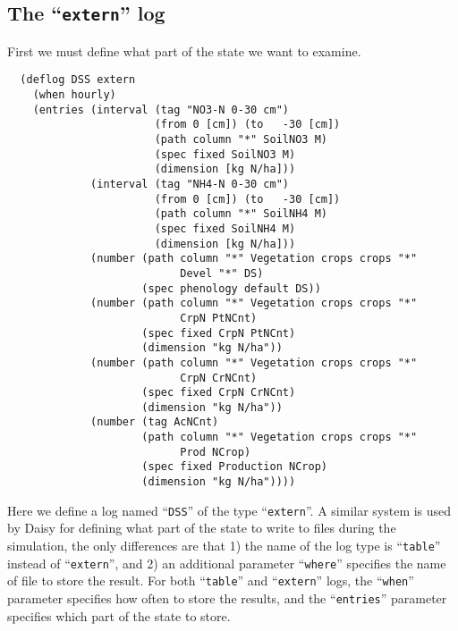 \documentclass[a4paper]{article}
\newcommand{\dname}[1]{``\texttt{#1}''}
\begin{document}
\subsection{The \dname{extern} log}

First we must define what part of the state we want to examine.
\begin{verbatim}
  (deflog DSS extern
    (when hourly)
    (entries (interval (tag "NO3-N 0-30 cm")
                       (from 0 [cm]) (to   -30 [cm])
                       (path column "*" SoilNO3 M)
                       (spec fixed SoilNO3 M)
                       (dimension [kg N/ha]))
             (interval (tag "NH4-N 0-30 cm")
                       (from 0 [cm]) (to   -30 [cm])
                       (path column "*" SoilNH4 M)
                       (spec fixed SoilNH4 M)
                       (dimension [kg N/ha]))
             (number (path column "*" Vegetation crops crops "*"
                           Devel "*" DS)
                     (spec phenology default DS))
             (number (path column "*" Vegetation crops crops "*"
                           CrpN PtNCnt)
                     (spec fixed CrpN PtNCnt)
                     (dimension "kg N/ha"))
             (number (path column "*" Vegetation crops crops "*"
                           CrpN CrNCnt)
                     (spec fixed CrpN CrNCnt)
                     (dimension "kg N/ha"))
             (number (tag AcNCnt)
                     (path column "*" Vegetation crops crops "*"
                           Prod NCrop)
                     (spec fixed Production NCrop)
                     (dimension "kg N/ha"))))
\end{verbatim}
Here we define a log named \dname{DSS} of the type \dname{extern}.  A
similar system is used by Daisy for defining what part of the state to
write to files during the simulation, the only differences are that 1)
the name of the log type is \dname{table} instead of \dname{extern},
and 2) an additional parameter \dname{where} specifies the name of
file to store the result.  For both \dname{table} and \dname{extern}
logs, the \dname{when} parameter specifies how often to store the
results, and the \dname{entries} parameter specifies which part of the
state to store.
\end{document}
